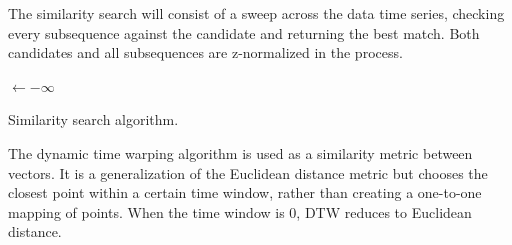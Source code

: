 The similarity search will consist of a sweep across the data time series, checking every subsequence against the candidate and returning the best match.
Both candidates and all subsequences are z-normalized in the process.
\begin{algorithm}[h]
 \Best$\leftarrow -\infty$\;
 \caption{Similarity search algorithm.}
 \label{alg:similarity}
\end{algorithm}

The dynamic time warping algorithm is used as a similarity metric between vectors. It is a generalization of the Euclidean distance metric but chooses the closest point within a certain time window, rather than creating a one-to-one mapping of points. When the time window is 0, DTW reduces to Euclidean distance.

